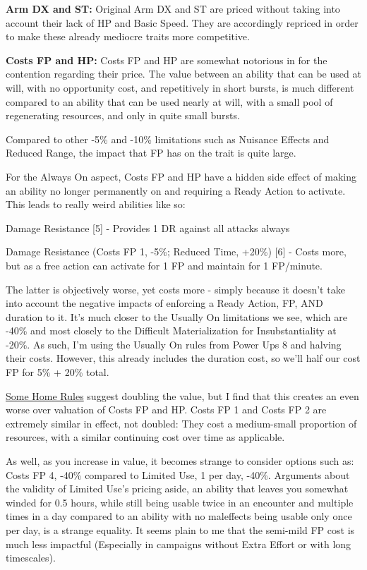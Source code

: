 \begin{multicols*}{2}
	\textbf{Arm DX and ST:} Original Arm DX and ST are priced without taking into account their lack of HP and Basic Speed. They are accordingly repriced in order to make these already mediocre traits more competitive.
	
	\textbf{Costs FP and HP:} Costs FP and HP are somewhat notorious in \GURPS for the contention regarding their price. The value between an ability that can be used at will, with no opportunity cost, and repetitively in short bursts, is much different compared to an ability that can be used nearly at will, with a small pool of regenerating resources, and only in quite small bursts.
	
	Compared to other -5\% and -10\% limitations such as Nuisance Effects and Reduced Range, the impact that FP has on the trait is quite large.
	
	For the Always On aspect, Costs FP and HP have a hidden side effect of making an ability no longer permanently on and requiring a Ready Action to activate. This leads to really weird abilities like so:
	
	Damage Resistance [5] - Provides 1 DR against all attacks always
	
	Damage Resistance (Costs FP 1, -5\%; Reduced Time, +20\%) [6] - Costs more, but as a free action can activate for 1 FP and maintain for 1 FP/minute.
	
	The latter is objectively worse, yet costs more - simply because it doesn't take into account the negative impacts of enforcing a Ready Action, FP, AND duration to it. It's much closer to the Usually On limitations we see, which are -40\% and most closely to the Difficult Materialization for Insubstantiality at -20\%. As such, I'm using the Usually On rules from Power Ups 8 and halving their costs. However, this already includes the duration cost, so we'll half our cost FP for 5\% + 20\% total.
	
	\textcolor{Blue}{\href{http://www.mygurps.com/index.php?n=Main.GURPSHouseRules}{Some Home Rules}} suggest doubling the value, but I find that this creates an even worse over valuation of Costs FP and HP. Costs FP 1 and Costs FP 2 are extremely similar in effect, not doubled: They cost a medium-small proportion of resources, with a similar continuing cost over time as applicable. 
	
	As well, as you increase in value, it becomes strange to consider options such as: Costs FP 4, -40\% compared to Limited Use, 1 per day, -40\%. Arguments about the validity of Limited Use's pricing aside, an ability that leaves you somewhat winded for 0.5 hours, while still being usable twice in an encounter and multiple times in a day compared to an ability with no maleffects being usable only once per day, is a strange equality. It seems plain to me that the semi-mild FP cost is much less impactful (Especially in campaigns without Extra Effort or with long timescales).
	

\end{multicols*}
